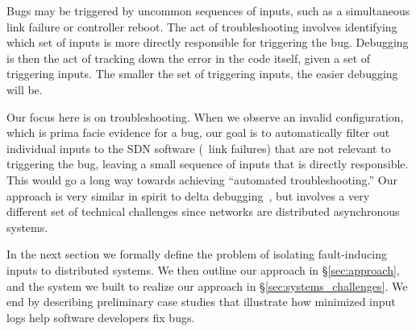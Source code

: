 Bugs may be triggered by uncommon sequences of inputs, such as a simultaneous link failure or controller reboot.
The act of troubleshooting involves identifying which set of inputs is more directly responsible for triggering the bug.
Debugging is then the act of tracking down the error in the code itself, given a
set of triggering inputs.
The smaller the set of triggering inputs, the easier debugging will be.

Our focus here is on troubleshooting. When we observe an invalid
configuration,
which is prima facie evidence for a bug, our goal is
to automatically filter out individual inputs to the SDN software (\eg~link failures)
that are not relevant to triggering the bug, leaving a small sequence of inputs
that is directly responsible.
This would go a long way towards achieving ``automated troubleshooting.'' Our approach is very similar in spirit to delta debugging~\cite{Zeller:1999:YMP:318773.318946}, but involves a very different set of technical challenges since networks are distributed asynchronous systems.

In the next section we formally define the problem of isolating fault-inducing
inputs to distributed systems. We then outline our approach in
\S\ref{sec:approach}, and the
system we built to realize our approach in \S\ref{sec:systems_challenges}.
We end by describing preliminary case studies that illustrate how minimized
input logs help software developers fix bugs.
